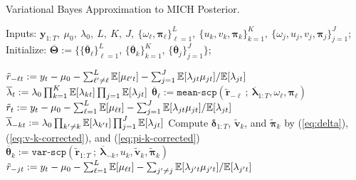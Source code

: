 \begin{algorithm}
\label{alg:mich}
\caption{Variational Bayes Approximation to MICH Posterior.}

\footnotesize
\SetAlgoLined
  Inputs: $\mathbf{y}_{1:T},\:\mu_0,\:\lambda_0,\:L,\:K,\:J,\:\{\omega_\ell,\boldsymbol{\pi}_\ell\}_{\ell=1}^L,\:\{u_k,v_k,\boldsymbol{\pi}_k\}_{k=1}^K,\:\{\omega_j,u_j,v_j,\boldsymbol{\pi}_j\}_{j=1}^J;$ \\
  Initialize: $\overline{\boldsymbol{\Theta}} := \{\{\overline{\boldsymbol{\theta}}_\ell\}_{\ell=1}^L$, $\{\overline{\boldsymbol{\theta}}_k\}_{k=1}^K$, $\{\overline{\boldsymbol{\theta}}_j\}_{j=1}^J\}$;
  
   {
     {
      $\tilde{r}_{-\ell t} := y_t -\mu_0- \sum_{\ell' \neq \ell}^L \mathbb{E}[\mu_{\ell' t}] - \sum_{j =1}^J \mathbb{E}[\lambda_{jt} \mu_{jt}] / \mathbb{E}[\lambda_{jt}]$ 
      $\overline{\lambda}_{t} := \lambda_0\prod_{k=1}^K \mathbb{E}[\lambda_{kt}]\prod_{j=1}\mathbb{E}[\lambda_{jt}]$  
      $\overline{\boldsymbol{\theta}}_\ell := \texttt{mean-scp}(\tilde{\mathbf{r}}_{-\ell} \:;\: \overline{\boldsymbol{\lambda}}_{1:T}, \omega_{\ell}, \boldsymbol{\boldsymbol{\pi}}_{\ell})$ 
    }
     {
      $\tilde{r}_{t} := y_t  -\mu_0- \sum_{\ell = 1}^L \mathbb{E}[\mu_{\ell t}] - \sum_{j=1}^J \mathbb{E}[\lambda_{jt} \mu_{jt}] / \mathbb{E}[\lambda_{jt}]$  
      $\overline{\lambda}_{-kt} :=  \lambda_0\prod_{k' \neq k} \mathbb{E}[\lambda_{k't}]\prod_{j=1}^J\mathbb{E}[\lambda_{jt}] $  
      Compute $\boldsymbol{\delta}_{1:T}$, $\tilde{\mathbf{v}}_{k}$, and $\tilde{\boldsymbol{\boldsymbol{\pi}}}_{k}$ by (\ref{eq:delta}), (\ref{eq:v-k-corrected}), and (\ref{eq:pi-k-corrected})  
      $\overline{\boldsymbol{\theta}}_k := \texttt{var-scp}(\tilde{\mathbf{r}}_{1:T} 
      \:;\:\overline{\boldsymbol{\lambda}}_{-k}, u_k, \tilde{\mathbf{v}}_{k}, \tilde{\boldsymbol{\boldsymbol{\pi}}}_k)$ 
    }
     {
      $\tilde{r}_{-jt} := y_t -\mu_0- \sum_{\ell = 1}^L \mathbb{E}[\mu_{\ell t}] - \sum_{j' \neq j} \mathbb{E}[\lambda_{j't} \mu_{j't}] / \mathbb{E}[\lambda_{j't}]$  
}}
\end{algorithm}
